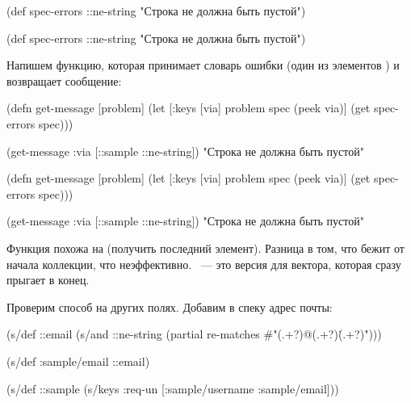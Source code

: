 \label{spec-errors}

\ifnarrow

\begin{clojure}
(def spec-errors
  {::ne-string
   "Строка не должна быть пустой"})
\end{clojure}

\else



\begin{clojure}
(def spec-errors
  {::ne-string "Строка не должна быть пустой"})
\end{clojure}
\fi

Напишем функцию, которая принимает словарь ошибки (один из элементов
) и возвращает сообщение:


\pagebreakafive

\ifnarrow

\begin{clojure}
(defn get-message [problem]
  (let [{:keys [via]} problem
        spec (peek via)]
    (get spec-errors spec)))

(get-message {:via [::sample
                    ::ne-string]})
"Строка не должна быть пустой"
\end{clojure}

\else

\begin{clojure}
(defn get-message [problem]
  (let [{:keys [via]} problem
        spec (peek via)]
    (get spec-errors spec)))

(get-message {:via [::sample ::ne-string]})
"Строка не должна быть пустой"
\end{clojure}

\fi

Функция  похожа на  (получить последний
элемент). Разница в том, что  бежит от начала коллекции, что
неэффективно. ~--- это версия  для вектора, которая сразу
прыгает в конец.

Проверим способ на других полях. Добавим в спеку  адрес почты:


\ifnarrow


\begin{clojure}
(s/def ::email
  (s/and
    ::ne-string
    (partial re-matches
      #"(.+?)@(.+?)\.(.+?)")))

(s/def :sample/email ::email)

(s/def ::sample
  (s/keys :req-un [:sample/username
                   :sample/email]))
\end{clojure}


